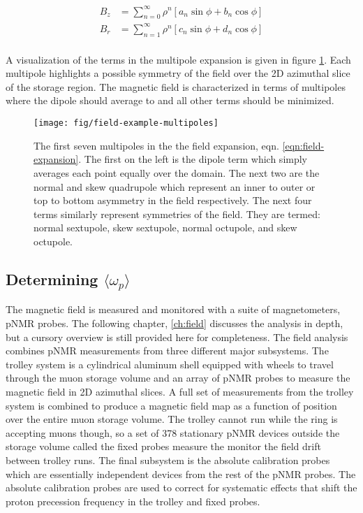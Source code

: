 \begin{align}
\label{eqn:field-expansion}
B_z & = \sum_{n=0}^{\infty} \rho^n[a_n \sin{\phi} + b_n \cos{\phi}] \\
B_r & = \sum_{n=1}^{\infty} \rho^n[c_n \sin{\phi} + d_n \cos{\phi}] \\
\end{align}

\noindent
A visualization of the terms in the multipole expansion is given in figure \ref{fig:field-example-multipoles}.  Each multipole highlights a possible symmetry of the field over the 2D azimuthal slice of the storage region. The magnetic field is characterized in terms of multipoles where the dipole should average to \bmagic and all other terms should be minimized.

\begin{figure}
\texttt{[image: fig/field-example-multipoles]}
\caption{The first seven multipoles in the the field expansion, eqn. \ref{eqn:field-expansion}.  The first on the left is the dipole term which simply averages each point equally over the domain.  The next two are the normal and skew quadrupole which represent an inner to outer or top to bottom asymmetry in the field respectively.  The next four terms similarly represent symmetries of the field.  They are termed: normal sextupole, skew sextupole, normal octupole, and skew octupole. \label{fig:field-example-multipoles}}
\end{figure}

\subsection{Determining $\langle \omega_p \rangle$}

The magnetic field is measured and monitored with a suite of magnetometers, pNMR probes. The following chapter, \ref{ch:field} discusses the analysis in depth, but a cursory overview is still provided here for completeness.  The field analysis combines pNMR measurements from three different major subsystems.  The trolley system is a cylindrical aluminum shell equipped with wheels to travel through the muon storage volume and an array of pNMR probes to measure the magnetic field in 2D azimuthal slices.  A full set of measurements from the trolley system is combined to produce a magnetic field map as a function of position over the entire muon storage volume.  The trolley cannot run while the ring is accepting muons though, so a set of 378 stationary pNMR devices outside the storage volume called the fixed probes measure the monitor the field drift between trolley runs.  The final subsystem is the absolute calibration probes which are essentially independent devices from the rest of the pNMR probes.  The absolute calibration probes are used to correct for systematic effects that shift the proton precession frequency in the trolley and fixed probes.

